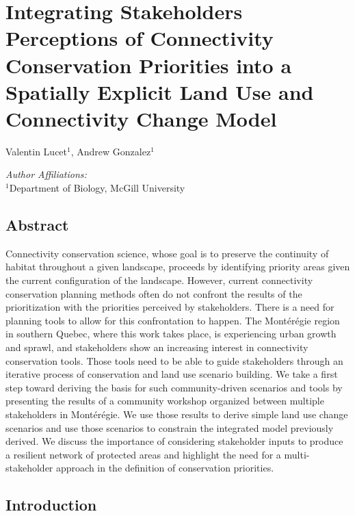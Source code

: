 \chapter{Integrating Stakeholders Perceptions of Connectivity Conservation Priorities into a Spatially Explicit Land Use and Connectivity Change Model}
\begin{center}
{Valentin Lucet$^{1}$, Andrew Gonzalez$^{1}$}\\
\end{center}
\textit{Author Affiliations:}\\
\normalsize{$^{1}$Department of Biology, McGill University}\\

\newrefsection

\section{Abstract}

Connectivity conservation science, whose goal is to preserve the continuity of habitat throughout a given landscape, proceeds by identifying priority areas given the current configuration of the landscape. However, current connectivity conservation planning methods often do not confront the results of the prioritization with the priorities perceived by stakeholders. There is a need for planning tools to allow for this confrontation to happen. The Montérégie region in southern Quebec, where this work takes place, is experiencing urban growth and sprawl, and stakeholders show an increasing interest in connectivity conservation tools. Those tools need to be able to guide stakeholders through an iterative process of conservation and land use scenario building. We take a first step toward deriving the basis for such community-driven scenarios and tools by presenting the results of a community workshop organized between multiple stakeholders in Montérégie. We use those results to derive simple land use change scenarios and use those scenarios to constrain the integrated model previously derived. We discuss the importance of considering stakeholder inputs to produce a resilient network of protected areas and highlight the need for a multi- stakeholder approach in the definition of conservation priorities. \\

\newpage

\section{Introduction}
%

